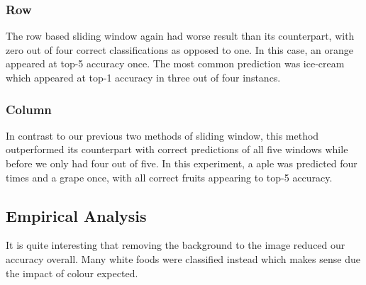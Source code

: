 \subsubsection*{Row}
The row based sliding window again had worse result than its counterpart, with
zero out of four correct classifications as opposed to one. In this case, an
orange appeared at top-5 accuracy once. The most common prediction was ice-cream
which appeared at top-1 accuracy in three out of four instancs.

\subsubsection*{Column}
In contrast to our previous two methods of sliding window, this method
outperformed its counterpart with correct predictions of all five windows while
before we only had four out of five. In this experiment, a aple was predicted
four times and a grape once, with all correct fruits appearing to top-5
accuracy.

\subsection*{Empirical Analysis}
It is quite interesting that removing the background to the image reduced our
accuracy overall. Many white foods were classified instead which makes sense due
the impact of colour expected.
